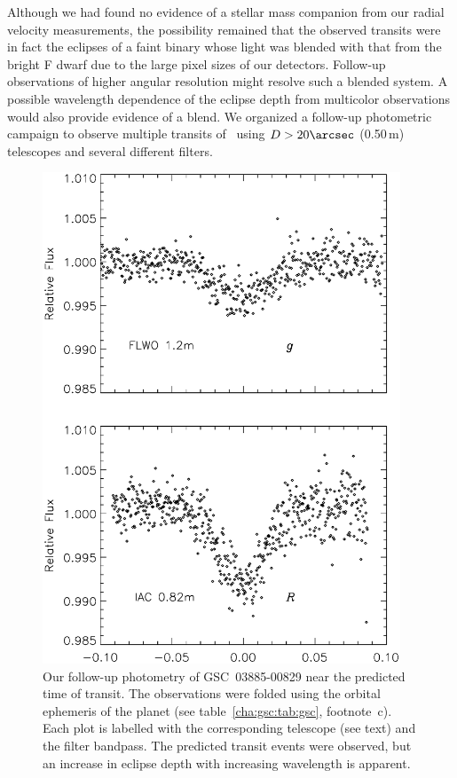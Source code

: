 Although we had found no evidence of a stellar mass companion from our
radial velocity measurements, the possibility remained that the
observed transits were in fact the eclipses of a faint binary whose
light was blended with that from the bright F dwarf due to the large
pixel sizes of our detectors. Follow-up observations of higher
angular resolution might resolve such a blended system. A possible
wavelength dependence of the eclipse depth from multicolor
observations would also provide evidence of a blend. We organized a
follow-up photometric campaign to observe multiple transits of \gscOTE\
using $D>20\arcsec$ (0.50\,m) telescopes and several different filters.

\begin{figure}
\begin{center}
\includegraphics[width=0.95\textwidth]{3_f4}
\caption[Color dependence of recovered transits of \mbox{GSC 03885-00829}]{Our follow-up photometry of \mbox{GSC 03885-00829} near
  the predicted time of transit. The observations were folded using
  the orbital ephemeris of the planet (see table~\ref{cha:gsc:tab:gsc}, footnote~c). Each
  plot is labelled with the corresponding telescope (see text) and
  the filter bandpass. The predicted transit events were observed, but
  an increase in eclipse depth with increasing wavelength is
  apparent.}
\label{cha:gsc:fig:multicolor}
\end{center}
\end{figure}


